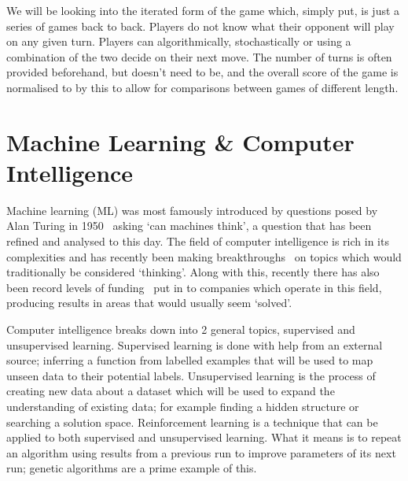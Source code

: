 We will be looking into the iterated form of the game which, simply put, is just a series of games back to back. 
Players do not know what their opponent will play on any given turn.
Players can algorithmically, stochastically or using a combination of the two decide on their next move.
The number of turns is often provided beforehand, but doesn't need to be, and the overall score of the game is normalised to by this to allow for comparisons between games of different length.

\section{Machine Learning \& Computer Intelligence}\label{sec:machineLearningAndcomputerIntelligence}
Machine learning (ML) was most famously introduced by questions posed by Alan Turing in 1950~\cite{turing1950computing} asking `can machines think', a question that has been refined and analysed to this day.
The field of computer intelligence is rich in its complexities and has recently been making breakthroughs~\cite{knight2017alphaZeroMIT} on topics which would traditionally be considered `thinking'.
Along with this, recently there has also been record levels of funding~\cite{chui2017artificial} put in to companies which operate in this field, producing results in areas that would usually seem `solved'.

Computer intelligence breaks down into 2 general topics, supervised and unsupervised learning.
Supervised learning is done with help from an external source; inferring a function from labelled examples that will be used to map unseen data to their potential labels.
Unsupervised learning is the process of creating new data about a dataset which will be used to expand the understanding of existing data; for example finding a hidden structure or searching a solution space.
Reinforcement learning is a technique that can be applied to both supervised and unsupervised learning.
What it means is to repeat an algorithm using results from a previous run to improve parameters of its next run; genetic algorithms are a prime example of this.

